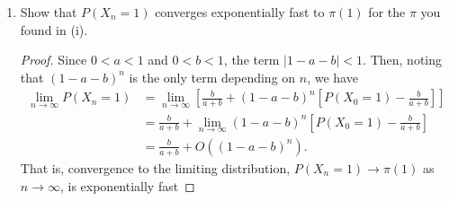\documentclass[oneside,reqno]{amsart}
\theoremstyle{definition}
\begin{document}
\begin{enumerate}
\begin{proof}[Proof (by induction on $n$)]
The base case $n=0$ holds since 
\begin{align*}
	P(X_0 = 1) &= \frac{b}{a+b} + (1-a-b)^0 \left[P(X_0 = 1)- \frac{b}{a+b}\right] \\
					 &= \frac{b}{a+b} + P(X_0 = 1)- \frac{b}{a+b} = P(X_0 = 1),
\end{align*} 
and the base case $n=1$ holds since
\begin{align*}
	P(X_1 = 1) &= \sum_{i} P(X_{1} = 1 \mid X_0 = i) P(X_0 = i) \\
					&= P(X_{1} = 1 \mid X_0 = 1) P(X_0 = 1) +  P(X_{1} = 1 \mid X_0 = 2) P(X_0 = 2) \\
					&= (1-a) P(X_0 = 1) +  b (1- P(X_0 = 1) )\\
					&=\frac{b}{a+b} + (1-a-b) \left[P(X_0 = 1)- \frac{b}{a+b}\right]
\end{align*}
where the last equality uses the same logic as in $(ii)$.
\par
Assume the claim is true for any $n$. We want to show that the result is also true for $n+1$. From (i), we know that 
\[
	P(X_{n+1} = 1) = \frac{b}{a+b} + (1-a-b)\left[P(X_n = 1)- \frac{b}{a+b}\right].
\]
Substituting in for $P(X_n=1)$ gives 
\begin{align*}
	P(X_{n+1} = 1) &= \frac{b}{a+b} + (1-a-b)\left[\left[(1-a-b)^n \left[P(X_0 = 1)- \frac{b}{a+b}\right]\right] - \frac{b}{a+b}\right] \\
	&= \frac{b}{a+b} + (1-a-b)^{n+1}\left[P(X_0 = 1)- \frac{b}{a+b}\right].
\end{align*}	
Shifting the indices back one period gives
\[
	P(X_n = 1) = \frac{b}{a+b} + (1-a-b)^n \left[P(X_0 = 1)- \frac{b}{a+b}\right].
\]
\end{proof}

\item
Show that $P(X_n=1)$ converges exponentially fast to $\pi(1)$ for the $\pi$ you found in (i).

\begin{proof}
Since $0<a<1$ and $0<b<1$, the term $|1-a-b| < 1$. Then, noting that $(1-a-b)^n$ is the only term depending on $n$, we have
\begin{align*}
	\lim_{n \to \infty} P(X_n = 1) &= \lim_{n \to \infty}\left[ \frac{b}{a+b} + (1-a-b)^n \left[P(X_0 = 1)- \frac{b}{a+b}\right]\right] \\
	&=  \frac{b}{a+b} + \lim_{n \to \infty} (1-a-b)^n  \left[ P(X_0 = 1) - \frac{b}{a+b} \right] \\	
		&=  \frac{b}{a+b} + O((1-a-b)^{n}). 
\end{align*}
That is, convergence to the limiting distribution, $P(X_n=1) \to \pi(1)$ as $n \to \infty$, is exponentially fast
\end{proof}
\end{enumerate}
\end{document}
